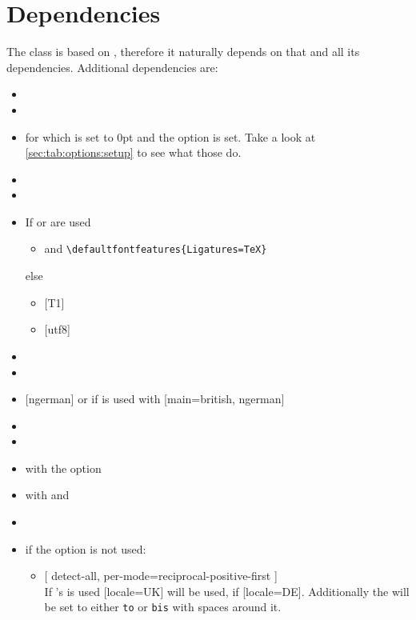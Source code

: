 \section{Dependencies}%
The class is based on , therefore it naturally depends on that
and all its dependencies. Additional dependencies are:
\begin{multicols}{2}%
  \begin{itemize}[leftmargin=10pt]
    \item {}
    \item {}
    \item {} for which  is set to 0pt and the option
       is set. Take a look at \autoref{sec:tab:options:setup} to
      see what those do.
    \item {}
    \item {}
    \item If  or  are used
      \begin{itemize}[topsep=0pt]
        \item {} and
          \verb|\defaultfontfeatures|\hskip0pt\verb|{Ligatures=TeX}|
      \end{itemize}
      else
      \begin{itemize}[topsep=0pt]
        \item {} [T1]
        \item {} [utf8]
      \end{itemize}
    \item {}
    \item {}
    \item {} [ngerman] or if  is used with
      [main=british, ngerman]
    \item {}
    \item {}
    \item {} with the  option
    \item {} with  and 
    \item {}
    \item if the  option is not used:
      \begin{itemize}
        \item {}
          [%
            detect-all,
            per-mode=reciprocal-positive-first%
          ]\\
          If 's  is used [locale=UK] will be used, if
           [locale=DE]. Additionally the  will be
          set to either \texttt{to} or \texttt{bis} with spaces around it.
      \end{itemize}
  \end{itemize}
\end{multicols}%
